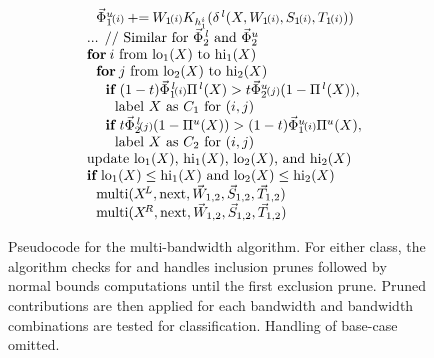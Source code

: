\documentclass[twoside,leqno,twocolumn]{article}
\DeclareMathOperator{\multi}{multi}
\newcommand{\x}{\\~~}
\newcommand{\xx}{\\~~~~}
\newcommand{\xxx}{\\~~~~~~}
\newcommand{\xxxx}{\\~~~~~~~~}
\newcommand{\xif}{{\bf if}\:}
\newcommand{\xfor}{{\bf for}\:}
\newcommand{\peq}{\mathbin{\mathord{+}\mathord{=}}}
\newcommand{\kdleft}[1]{#1^{\!L}}
\newcommand{\kdright}[1]{#1^{\!R}}
\newcommand{\lo}[1]{#1^{\,l}}
\newcommand{\hi}[1]{#1^u}
\begin{document}
\begin{figure}[tb]
\begin{center}
{\begin{minipage}{3.1in}
\begin{displaymath}
\begin{array}{l}
    \xx \hi{\vec{\Phi}_1}{\scriptstyle \!(i)} \peq W_1{\scriptstyle \!(i)} K_{h_1^i}(\lo{\delta}(X,W_1{\scriptstyle \!(i)},S_1{\scriptstyle \!(i)},T_1{\scriptstyle \!(i)}))
    \x \text{... // Similar for $\lo{\vec{\Phi}_2}$ and $\hi{\vec{\Phi}_2}$}
    \x \xfor i \text{ from } {\rm lo}_1(X) \text{ to } {\rm hi}_1(X)
    \xx \xfor j \text{ from } {\rm lo}_2(X) \text{ to } {\rm hi}_2(X)
    \xxx \xif (1-t) \lo{\vec{\Phi}_1}{\scriptstyle \!(i)} \lo{\Pi}(X) > t \hi{\vec{\Phi}_2}{\scriptstyle \!(j)} (1 - \lo{\Pi}(X)),
    \xxxx \text{label $X$ as $C_1$ for $(i,j)$}
    \xxx \xif t \lo{\vec{\Phi}_2}{\scriptstyle \!(j)} (1 - \hi{\Pi}(X)) > (1-t) \hi{\vec{\Phi}_1}{\scriptstyle \!(i)} \hi{\Pi}(X),
    \xxxx \text{label $X$ as $C_2$ for $(i,j)$}
    \x \text{update ${\rm lo}_1(X)$, ${\rm hi}_1(X)$, ${\rm lo}_2(X)$, and ${\rm hi}_2(X)$}
    \x \xif {\rm lo}_1(X) \leq {\rm hi}_1(X) \text{ and } {\rm lo}_2(X) \leq {\rm hi}_2(X)
    \xx \multi(\kdleft{X},{\rm next},\vec{W}_{1,2},\vec{S}_{1,2},\vec{T}_{1,2})
    \xx \multi(\kdright{X},{\rm next},\vec{W}_{1,2},\vec{S}_{1,2},\vec{T}_{1,2})
  \end{array}\end{displaymath}
  \end{minipage}}\end{center}
  \vspace{-10pt}
  \caption{\label{fig:multi} \footnotesize Pseudocode for the
    multi-bandwidth algorithm.  For either class, the algorithm checks
    for and handles inclusion prunes followed by normal bounds
    computations until the first exclusion prune.  Pruned
    contributions are then applied for each bandwidth and bandwidth
    combinations are tested for classification.  Handling of base-case
    omitted.}
\end{figure}



\end{document}
